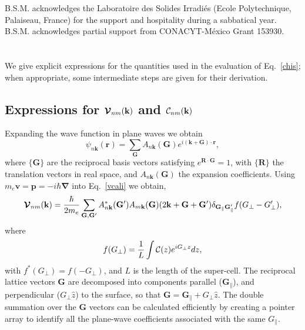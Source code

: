 \documentclass[floatfix,prb,aps,superscriptaddress,showpacs,letterpaper]{revtex4}
\begin{document}
B.S.M. acknowledges the Laboratoire des Solides Irradi\'es (Ecole
Polytechnique, Palaiseau, France) for the support and hospitality
during a sabbatical year. B.S.M. acknowledges partial support from
CONACYT-M\'exico Grant 153930. 

\appendix 
\section{}\label{appe}
We give explicit expressions for the quantities used in the evaluation 
of Eq.~\eqref{chis}; when appropriate, some 
intermediate steps are given for their derivation. 
\subsection{ Expressions for 
\texorpdfstring{${\boldsymbol{\mathcal{\cal V}}}_{nm}(\mathbf{k})$}{que} 
and 
\texorpdfstring{${\cal C}_{nm}(\mathbf{k})$}{que}
}\label{calpcalc}

Expanding the wave function in plane waves we obtain
\begin{equation*}
\psi_{n\mathbf{k}}(\mathbf{r})=\sum_\mathbf{G} A_{n\mathbf{k}}(\mathbf{G})e^{i(\mathbf{k}+\mathbf{G})\cdot\mathbf{r}}
,
\end{equation*}
where $\{\mathbf{G}\}$ are the reciprocal basis vectors satisfying
$e^{\mathbf{R}\cdot\mathbf{G}}=1$, with $\{\mathbf{R}\}$ the translation vectors in real
space, and $A_{n\mathbf{k}}(\mathbf{G})$ the expansion coefficients. Using
$m_e\mathbf{v}=\mathbf{p}=-i\hbar\boldsymbol{\nabla}$ into 
Eq.~\eqref{vcali}
we obtain,\cite{mendozaPRB06}
\begin{equation}
\boldsymbol{\mathcal{\cal V}}_{nm}(\mathbf{k})=
\frac{\hbar}{2m_e}
\sum_{\mathbf{G},\mathbf{G}'} A^*_{n\mathbf{k}}(\mathbf{G}')  A_{m\mathbf{k}}(\mathbf{G})
(2\mathbf{k}+\mathbf{G}+\mathbf{G}')
\delta_{\mathbf{G}_\parallel \mathbf{G}'_\parallel}  
f(G_\perp-G'_\perp)
,
\label{eni.2}
\end{equation}   
where
\begin{equation*}
f(G_\perp)=\frac{1}{L}\int{\mathbf{\cal C}}(z) e^{iG_\perp z}dz,
\end{equation*}
with $f^*(G_\perp)=f(-G_\perp)$,
and $L$
is the length of the super-cell. 
The reciprocal lattice vectors $\mathbf{G}$ are 
decomposed into components
parallel ($\mathbf{G}_\parallel$), and perpendicular ($G_\perp \hat z$)
to the surface, so
that $\mathbf{G} = \mathbf{G}_\parallel + G_\perp\hat z$.
The double summation over the $\mathbf{G}$ vectors can be 
calculated efficiently by  
creating a pointer array to identify all the plane-wave coefficients  
associated with the same $G_\parallel$.  
\end{document}
